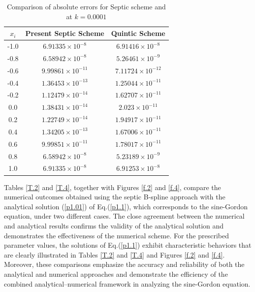 \documentclass[10pt,letterpaper,twoside]{article}
\begin{document}
\begin{table}[H]
 \centering
 \small
  \caption{Comparison of absolute errors for Septic scheme and \cite{35} at $k = 0.0001$}
  \label{T.02}
  \renewcommand{\arraystretch}{1.1}
  \begin{tabular}{|c|c|c|}
   \hline
   \textbf{$x_{i}$} & \textbf{Present Septic Scheme} & \textbf{Quintic Scheme \cite{35}} \\ \hline
   -1.0 & $6.91335\times10^{-8}$ & $6.91416\times10^{-8}$ \\ \hline
   -0.8 & $6.58942\times10^{-8}$ & $5.26461\times10^{-9}$ \\ \hline
   -0.6 & $9.99861\times10^{-11}$ & $7.11724\times10^{-12}$ \\ \hline
   -0.4 & $1.36453\times10^{-13}$ & $1.25044\times10^{-11}$ \\ \hline
   -0.2 & $1.12479\times10^{-14}$ & $1.62707\times10^{-11}$ \\ \hline
   0.0 & $1.38431\times10^{-14}$ & $2.023\times10^{-11}$ \\ \hline
   0.2 & $1.22749\times10^{-14}$ & $1.94917\times10^{-11}$ \\ \hline
   0.4 & $1.34205\times10^{-13}$ & $1.67006\times10^{-11}$ \\ \hline
   0.6 & $9.99851\times10^{-11}$ & $1.78017\times10^{-11}$ \\ \hline
   0.8 & $6.58942\times10^{-8}$ & $5.23189\times10^{-9}$ \\ \hline
   1.0 & $6.91335\times10^{-8}$ & $6.91253\times10^{-8}$ \\ \hline
  \end{tabular}
 \end{table}

Tables \ref{T.2} and \ref{T.4}, together with Figures \ref{f.2} and \ref{f.4}, compare the numerical outcomes obtained using the septic B-spline approach with the analytical solution (\ref{p1.01}) of Eq.(\ref{p1.1}), which corresponds to the sine-Gordon equation, under two different cases. The close agreement between the numerical and analytical results confirms the validity of the analytical solution and demonstrates the effectiveness of the numerical scheme. For the prescribed parameter values, the solutions of Eq.(\ref{p1.1}) exhibit characteristic behaviors that are clearly illustrated in Tables \ref{T.2} and \ref{T.4} and Figures \ref{f.2} and \ref{f.4}. Moreover, these comparisons emphasize the accuracy and reliability of both the analytical and numerical approaches and demonstrate the efficiency of the combined analytical--numerical framework in analyzing the sine-Gordon equation.
\end{document}
